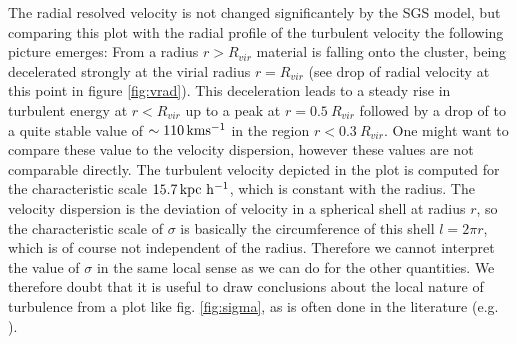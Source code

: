 The radial resolved velocity is not changed significantely by
the SGS model, but comparing this plot with the radial profile of the turbulent
velocity the following picture emerges: From a radius $r > R_{vir}$
material is falling onto the cluster, being decelerated strongly at the
virial radius $r = R_{vir}$ (see drop of radial velocity at this point in
figure \ref{fig:vrad}). This deceleration leads to a steady rise in turbulent
energy at $r<R_{vir}$ up to a peak at $r=0.5\ R_{vir}$ followed by a drop of to
a quite stable value of $\sim \unit[110]{km s^{-1}}$ in the region 
$r<0.3\ R_{vir}$. One might want to compare these value to the velocity
dispersion, however these values are not comparable directly. The turbulent
velocity depicted in the plot is computed for the characteristic scale
$\unit[15.7]{kpc\ h^{-1}}$, which is constant with the radius. The velocity
dispersion is the deviation of velocity in a spherical shell at radius $r$, so
the characteristic scale of $\sigma$ is basically the circumference of this
shell
$l=2\pi r$, which is of course not independent of the radius. Therefore we
cannot interpret the value of $\sigma$ in the same local sense as we can do for
the other quantities. We therefore doubt that it is useful to draw conclusions
about the local nature of turbulence from a plot like fig. \ref{fig:sigma}, as
is often done in the literature (e.g. \citep{Norman1999a}). 

